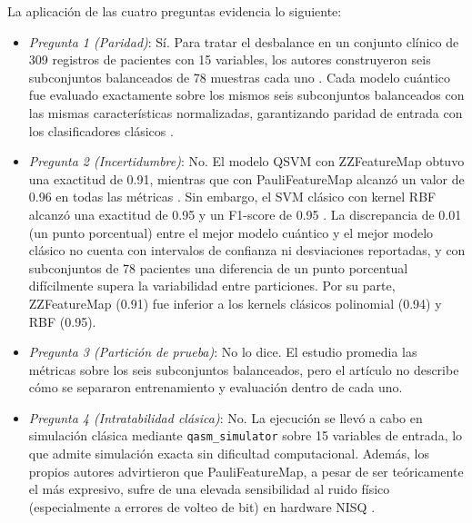 La aplicación de las cuatro preguntas evidencia lo siguiente:
\begin{itemize}
  \item \textit{Pregunta 1 (Paridad)}: Sí. 
Para tratar el desbalance en un conjunto clínico de 309 registros de pacientes con 15 variables, los autores construyeron seis subconjuntos balanceados de 78 muestras cada uno \cite{ElHafidi2025}.
Cada modelo cuántico fue evaluado exactamente sobre los mismos seis subconjuntos balanceados con las mismas características normalizadas, garantizando paridad de entrada con los clasificadores clásicos \cite{ElHafidi2025}.
  \item \textit{Pregunta 2 (Incertidumbre)}: No. 
El modelo QSVM con ZZFeatureMap obtuvo una exactitud de 0.91, mientras que con PauliFeatureMap alcanzó un valor de 0.96 en todas las métricas \cite{ElHafidi2025}.
Sin embargo, el SVM clásico con kernel RBF alcanzó una exactitud de 0.95 y un F1-score de 0.95 \cite{ElHafidi2025}. La discrepancia de 0.01 (un punto porcentual) entre el mejor modelo cuántico y el mejor modelo clásico no cuenta con intervalos de confianza ni desviaciones reportadas, y con subconjuntos de 78 pacientes una diferencia de un punto porcentual difícilmente supera la variabilidad entre particiones. Por su parte, ZZFeatureMap (0.91) fue inferior a los kernels clásicos polinomial (0.94) y RBF (0.95).
  \item \textit{Pregunta 3 (Partición de prueba)}: No lo dice. El estudio promedia las métricas sobre los seis subconjuntos balanceados, pero el artículo no describe cómo se separaron entrenamiento y evaluación dentro de cada uno.
  \item \textit{Pregunta 4 (Intratabilidad clásica)}: No. La ejecución se llevó a cabo en simulación clásica mediante \texttt{qasm\_simulator} sobre 15 variables de entrada, lo que admite simulación exacta sin dificultad computacional. Además,
los propios autores advirtieron que PauliFeatureMap, a pesar de ser teóricamente el más expresivo, sufre de una elevada sensibilidad al ruido físico (especialmente a errores de volteo de bit) en hardware NISQ \cite{ElHafidi2025}.
\end{itemize}

